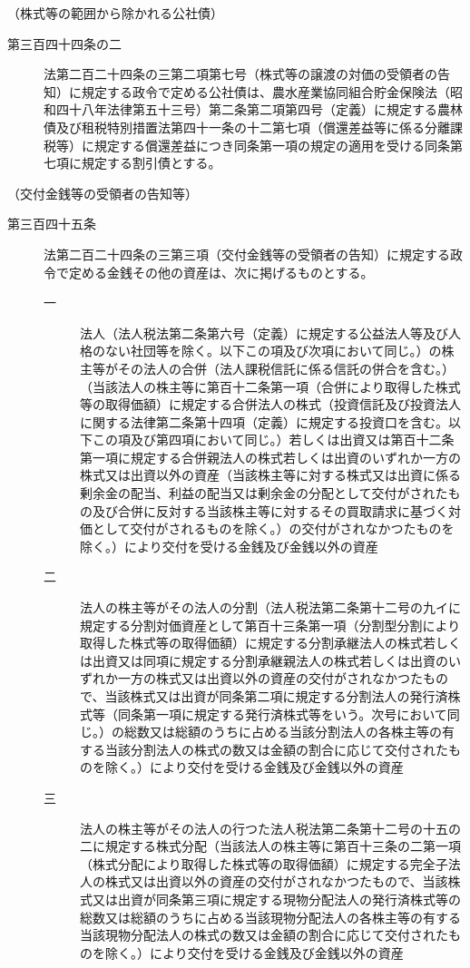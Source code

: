 \documentclass[twocolumn,a4j,10pt]{ltjtarticle}
\begin{document}
\noindent\hspace{10pt}（株式等の範囲から除かれる公社債）
\begin{description}
\item[第三百四十四条の二]法第二百二十四条の三第二項第七号（株式等の譲渡の対価の受領者の告知）に規定する政令で定める公社債は、農水産業協同組合貯金保険法（昭和四十八年法律第五十三号）第二条第二項第四号（定義）に規定する農林債及び租税特別措置法第四十一条の十二第七項（償還差益等に係る分離課税等）に規定する償還差益につき同条第一項の規定の適用を受ける同条第七項に規定する割引債とする。
\end{description}
\noindent\hspace{10pt}（交付金銭等の受領者の告知等）
\begin{description}
\item[第三百四十五条]法第二百二十四条の三第三項（交付金銭等の受領者の告知）に規定する政令で定める金銭その他の資産は、次に掲げるものとする。
\begin{description}
\item[一]法人（法人税法第二条第六号（定義）に規定する公益法人等及び人格のない社団等を除く。以下この項及び次項において同じ。）の株主等がその法人の合併（法人課税信託に係る信託の併合を含む。）（当該法人の株主等に第百十二条第一項（合併により取得した株式等の取得価額）に規定する合併法人の株式（投資信託及び投資法人に関する法律第二条第十四項（定義）に規定する投資口を含む。以下この項及び第四項において同じ。）若しくは出資又は第百十二条第一項に規定する合併親法人の株式若しくは出資のいずれか一方の株式又は出資以外の資産（当該株主等に対する株式又は出資に係る剰余金の配当、利益の配当又は剰余金の分配として交付がされたもの及び合併に反対する当該株主等に対するその買取請求に基づく対価として交付がされるものを除く。）の交付がされなかつたものを除く。）により交付を受ける金銭及び金銭以外の資産
\item[二]法人の株主等がその法人の分割（法人税法第二条第十二号の九イに規定する分割対価資産として第百十三条第一項（分割型分割により取得した株式等の取得価額）に規定する分割承継法人の株式若しくは出資又は同項に規定する分割承継親法人の株式若しくは出資のいずれか一方の株式又は出資以外の資産の交付がされなかつたもので、当該株式又は出資が同条第二項に規定する分割法人の発行済株式等（同条第一項に規定する発行済株式等をいう。次号において同じ。）の総数又は総額のうちに占める当該分割法人の各株主等の有する当該分割法人の株式の数又は金額の割合に応じて交付されたものを除く。）により交付を受ける金銭及び金銭以外の資産
\item[三]法人の株主等がその法人の行つた法人税法第二条第十二号の十五の二に規定する株式分配（当該法人の株主等に第百十三条の二第一項（株式分配により取得した株式等の取得価額）に規定する完全子法人の株式又は出資以外の資産の交付がされなかつたもので、当該株式又は出資が同条第三項に規定する現物分配法人の発行済株式等の総数又は総額のうちに占める当該現物分配法人の各株主等の有する当該現物分配法人の株式の数又は金額の割合に応じて交付されたものを除く。）により交付を受ける金銭及び金銭以外の資産

\end{description}
\end{description}
\end{document}
